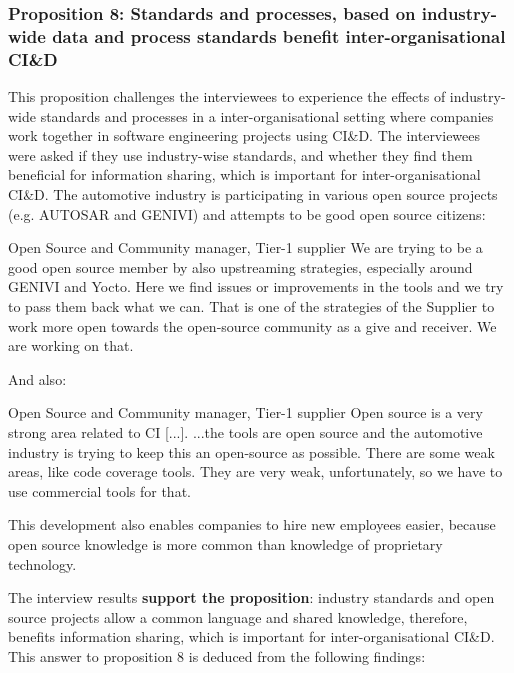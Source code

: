 \vspace{.2cm}
\subsubsection{Proposition 8: Standards and processes, based on industry-wide data and process standards benefit inter-organisational CI\&D}

This proposition challenges the interviewees to experience the effects of industry-wide standards and processes in a inter-organisational setting where companies work together in software engineering projects using CI\&D. The interviewees were asked if they use industry-wise standards, and whether they find them beneficial for information sharing, which is important for inter-organisational CI\&D. The automotive industry is participating in various open source projects (e.g. AUTOSAR and GENIVI) and attempts to be good open source citizens:

\begin{aquote}{Open Source and Community manager, Tier-1 supplier}
We are trying to be a good open source member by also upstreaming strategies, especially around GENIVI and Yocto. Here we find issues or improvements in the tools and we try to pass them back what we can. That is one of the strategies of the Supplier to work more open towards the open-source community as a give and receiver. We are working on that.
\end{aquote}

And also:

\begin{aquote}{Open Source and Community manager, Tier-1 supplier}
Open source is a very strong area related to CI [...]. ...the tools are open source and the automotive industry is trying to keep this an open-source as possible. There are some weak areas, like code coverage tools. They are very weak, unfortunately, so we have to use commercial tools for that.
\end{aquote}

This development also enables companies to hire new employees easier, because open source knowledge is more common than knowledge of proprietary technology.


The interview results {\bf support the proposition}: industry standards and open source projects allow a common language and shared knowledge, therefore, benefits information sharing, which is important for inter-organisational CI\&D. This answer to proposition 8 is deduced from the following findings:

